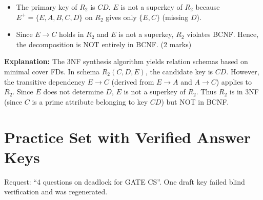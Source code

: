 \begin{tcolorbox}[enhanced,breakable,colback=boxgray,colframe=gray!45,boxrule=0.4pt,arc=2pt,left=6pt,right=6pt,top=4pt,bottom=4pt,title={Q.8},fonttitle=\bfseries\small,coltitle=black,colbacktitle=gray!15]
\begin{itemize}[leftmargin=1.4em,itemsep=1pt]
\item The primary key of $R_2$ is $CD$. $E$ is not a superkey of $R_2$ because $E^+ = \{E, A, B, C, D\}$ on $R_2$ gives only $\{E, C\}$ (missing $D$).
\item Since $E \rightarrow C$ holds in $R_2$ and $E$ is not a superkey, $R_2$ violates BCNF. Hence, the decomposition is NOT entirely in BCNF. (2 marks)
\end{itemize}\par\textbf{Explanation:} The 3NF synthesis algorithm yields relation schemas based on minimal cover FDs. In schema $R_2(C,D,E)$, the candidate key is $CD$. However, the transitive dependency $E \rightarrow C$ (derived from $E \rightarrow A$ and $A \rightarrow C$) applies to $R_2$. Since $E$ does not determine $D$, $E$ is not a superkey of $R_2$. Thus $R_2$ is in 3NF (since $C$ is a prime attribute belonging to key $CD$) but NOT in BCNF.\par
\end{tcolorbox}


\section{Practice Set with Verified Answer Keys}

Request: ``4 questions on deadlock for GATE CS''. One draft key failed blind verification and was regenerated.\par\medskip

